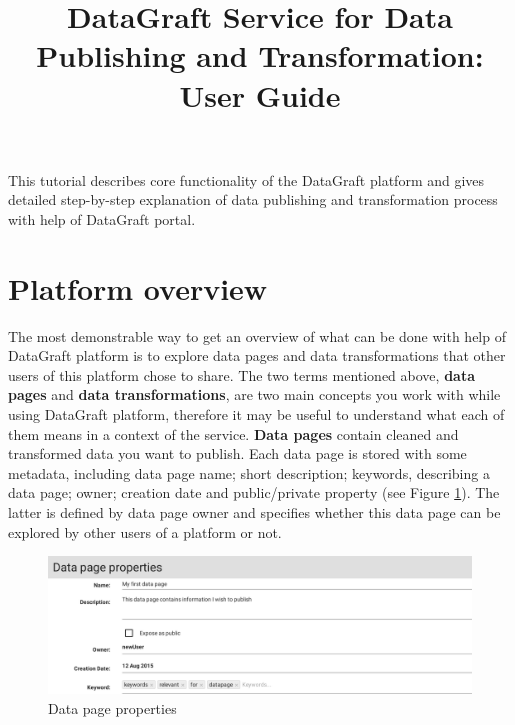 \documentclass[USenglish]{article}
\title{DataGraft Service for Data Publishing and Transformation: User Guide}
\date{}
\begin{document}
 \maketitle{}
This tutorial describes core functionality of the DataGraft platform and gives detailed step-by-step explanation of data publishing and transformation process with help of DataGraft portal.

\section{Platform overview}
The most demonstrable way to get an overview of what can be done with help of DataGraft platform is to explore data pages and data transformations that other users of this platform chose to share. The two terms mentioned above, \textbf{data pages} and \textbf{data transformations}, are two main concepts you work with while using DataGraft platform, therefore it may be useful to understand what each of them means in a context of the service. 
\newline
\newline
\textbf{Data pages} contain cleaned and transformed data you want to publish. Each data page is stored with some metadata, including data page name; short description; keywords, describing a data page; owner; creation date and public/private property (see Figure \ref{datapagemeta}). The latter is defined by data page owner and specifies whether this data page can be explored by other users of a platform or not. 


\begin{center}
\begin{figure}[!htbp]
\centering
\includegraphics[height=4 cm] {datapagemeta.png}
 \caption{Data page properties \label{datapagemeta}}
\end{figure}
\end{center}
\end{document}

